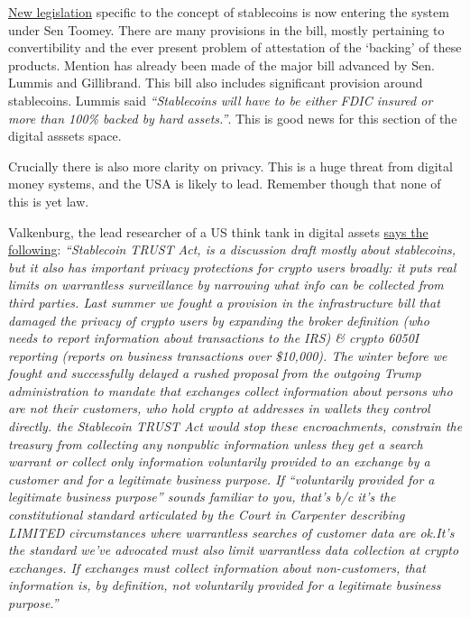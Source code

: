 \href{https://www.americanbanker.com/news/toomey-unveils-stablecoin-bill-granting-occ-authority-for-payments-charter}{New legislation} specific to the concept of stablecoins is now entering the system under Sen Toomey. There are many provisions in the bill, mostly pertaining to convertibility and the ever present problem of attestation of the `backing' of these products. Mention has already been made of the major bill advanced by Sen. Lummis and Gillibrand. This bill also includes significant provision around stablecoins. Lummis said \textit{``Stablecoins will have to be either FDIC insured or more than 100\% backed by hard assets.''}. This is good news for this section of the digital asssets space.\par
Crucially there is also more clarity on privacy. This is a huge threat from digital money systems, and the USA is likely to lead. Remember though that none of this is yet law.\par 
Valkenburg, the lead researcher of a US think tank in digital assets \href{https://twitter.com/valkenburgh/status/1511783339065237521}{says the following}: \textit{``Stablecoin TRUST Act, is a discussion draft mostly about stablecoins, but it also has important privacy protections for crypto users broadly: it puts real limits on warrantless surveillance by narrowing what info can be collected from third parties. Last summer we fought a provision in the infrastructure bill that damaged the privacy of crypto users by expanding the broker definition (who needs to report information about transactions to the IRS) \& crypto 6050I reporting (reports on business transactions over \$10,000). The winter before we fought and successfully delayed a rushed proposal from the outgoing Trump administration to mandate that exchanges collect information about persons who are not their customers, who hold crypto at addresses in wallets they control directly. the Stablecoin TRUST Act would stop these encroachments, constrain the treasury from collecting any nonpublic information unless they get a search warrant or collect only information voluntarily provided to an exchange by a customer and for a legitimate business purpose. If “voluntarily provided for a legitimate business purpose” sounds familiar to you, that’s b/c it's the constitutional standard articulated by the Court in Carpenter describing LIMITED circumstances where warrantless searches of customer data are ok.It’s the standard we’ve advocated must also limit warrantless data collection at crypto exchanges. If exchanges must collect information about non-customers, that information is, by definition, not voluntarily provided for a legitimate business purpose.''}



